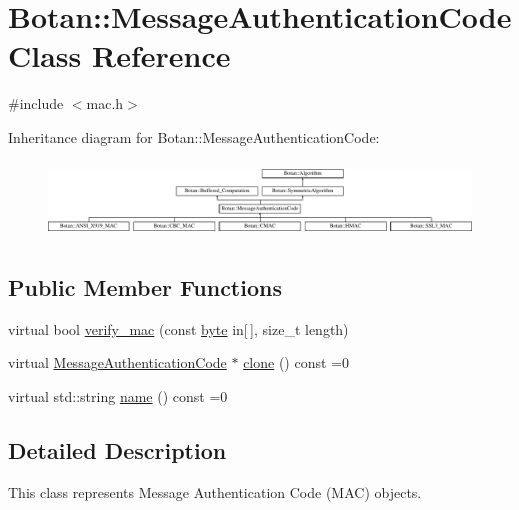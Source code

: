 \hypertarget{classBotan_1_1MessageAuthenticationCode}{\section{Botan\-:\-:Message\-Authentication\-Code Class Reference}
\label{classBotan_1_1MessageAuthenticationCode}
}


{\ttfamily \#include $<$mac.\-h$>$}

Inheritance diagram for Botan\-:\-:Message\-Authentication\-Code\-:\begin{figure}[H]
\begin{center}
\leavevmode
\includegraphics[height=2.045662cm]{classBotan_1_1MessageAuthenticationCode}
\end{center}
\end{figure}
\subsection*{Public Member Functions}
\begin{DoxyCompactItemize}
\item 
virtual bool \hyperlink{classBotan_1_1MessageAuthenticationCode_a976f69645f9af1f99edb93912218497e}{verify\-\_\-mac} (const \hyperlink{namespaceBotan_a7d793989d801281df48c6b19616b8b84}{byte} in\mbox{[}$\,$\mbox{]}, size\-\_\-t length)
\item 
virtual \hyperlink{classBotan_1_1MessageAuthenticationCode}{Message\-Authentication\-Code} $\ast$ \hyperlink{classBotan_1_1MessageAuthenticationCode_aa5b3c755f4f1732b9c239abbc0a78b9c}{clone} () const =0
\item 
virtual std\-::string \hyperlink{classBotan_1_1MessageAuthenticationCode_ad55f85c233b06772d43a5115c7f2fc64}{name} () const =0
\end{DoxyCompactItemize}


\subsection{Detailed Description}
This class represents Message Authentication Code (M\-A\-C) objects. 

